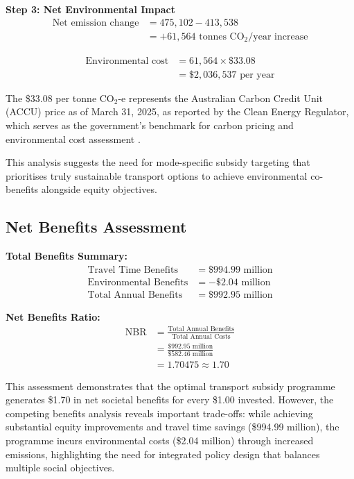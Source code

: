 \textbf{Step 3: Net Environmental Impact}
\begin{align}
\text{Net emission change} &= 475,102 - 413,538 \\
&= +61,564 \text{ tonnes CO}_2\text{/year increase}
\end{align}

\begin{align}
\text{Environmental cost} &= 61,564 \times \$33.08 \\
&= \$2,036,537 \text{ per year}
\end{align}

The \$33.08 per tonne CO$_2$-e represents the Australian Carbon Credit Unit (ACCU) price as of March 31, 2025, as reported by the Clean Energy Regulator, which serves as the government's benchmark for carbon pricing and environmental cost assessment \citep{CER_ACCU_2025}.

This analysis suggests the need for mode-specific subsidy targeting that prioritises truly sustainable transport options to achieve environmental co-benefits alongside equity objectives.
\subsection{Net Benefits Assessment}

\textbf{Total Benefits Summary:}
\begin{align}
\text{Travel Time Benefits} &= \$994.99 \text{ million} \\
\text{Environmental Benefits} &= -\$2.04 \text{ million} \\
\text{Total Annual Benefits} &= \$992.95 \text{ million}
\end{align}

\textbf{Net Benefits Ratio:}
\begin{align}
\text{NBR} &= \frac{\text{Total Annual Benefits}}{\text{Total Annual Costs}} \\
&= \frac{\$992.95 \text{ million}}{\$582.46 \text{ million}} \\
&= 1.70475 \approx 1.70
\end{align}

This assessment demonstrates that the optimal transport subsidy programme generates \$1.70 in net societal benefits for every \$1.00 invested. However, the competing benefits analysis reveals important trade-offs: while achieving substantial equity improvements and travel time savings (\$994.99 million), the programme incurs environmental costs (\$2.04 million) through increased emissions, highlighting the need for integrated policy design that balances multiple social objectives.

